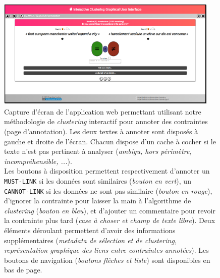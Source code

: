 			\begin{figure}[!htb]
				\centering
				\includegraphics[width=0.95\textwidth]{figures/etude-temps-annotation-0application-annotation}
				\caption{
					Capture d'écran de l'application web permettant utilisant notre méthodologie de \textit{clustering} interactif pour annoter des contraintes (page d'annotation). Les deux textes à annoter sont disposés à gauche et droite de l'écran. Chacun dispose d'un cache à cocher si le texte n'est pas pertinent à analyser (\textit{ambigu, hors périmètre, incompréhensible, ...}).\\
					Les boutons à disposition permettent respectivement d'annoter un \texttt{MUST-LINK} si les données sont similaires (\textit{bouton en vert}), un \texttt{CANNOT-LINK} si les données ne sont pas similaire (\textit{bouton en rouge}), d'ignorer la contrainte pour laisser la main à l'algorithme de \textit{clustering} (\textit{bouton en bleu}), et d'ajouter un commentaire pour revoir la contrainte plus tard (\textit{case à choser et champ de texte libre}). Deux éléments déroulant permettent d'avoir des informations supplémentaires (\textit{metadata de sélection et de \textit{clustering}, représentation graphique des liens entre contraintes annotées}). Les boutons de navigation (\textit{boutons flèches et liste}) sont disponibles en bas de page.
				}
				\label{figure:4.3.1-ETUDE-COUTS-TEMPS-ANNOTATION-APPLICATION-ANNOTATION}
			\end{figure}
